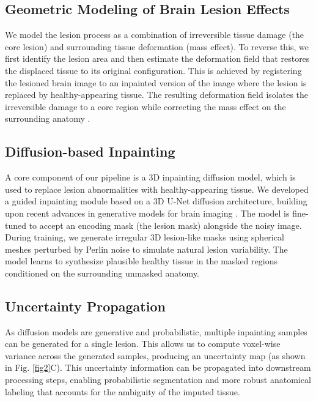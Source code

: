 \documentclass[runningheads]{llncs}
\begin{document}
\subsection{Geometric Modeling of Brain Lesion Effects}
We model the lesion process as a combination of irreversible tissue damage (the core lesion) and surrounding tissue deformation (mass effect). To reverse this, we first identify the lesion area and then estimate the deformation field that restores the displaced tissue to its original configuration. This is achieved by registering the lesioned brain image to an inpainted version of the image where the lesion is replaced by healthy-appearing tissue. The resulting deformation field isolates the irreversible damage to a core region while correcting the mass effect on the surrounding anatomy  \cite{Vercauteren2009}.


\subsection{Diffusion-based Inpainting}
A core component of our pipeline is a 3D inpainting diffusion model, which is used to replace lesion abnormalities with healthy-appearing tissue. We developed a guided inpainting module based on a 3D U-Net diffusion architecture, building upon recent advances in generative models for brain imaging \cite{Pinaya2022}. The model is fine-tuned to accept an encoding mask (the lesion mask) alongside the noisy image. During training, we generate irregular 3D lesion-like masks using spherical meshes perturbed by Perlin noise to simulate natural lesion variability. The model learns to synthesize plausible healthy tissue in the masked regions conditioned on the surrounding unmasked anatomy.


\subsection{Uncertainty Propagation}
As diffusion models are generative and probabilistic, multiple inpainting samples can be generated for a single lesion. This allows us to compute voxel-wise variance across the generated samples, producing an uncertainty map (as shown in Fig. \ref{fig2}C). This uncertainty information can be propagated into downstream processing steps, enabling probabilistic segmentation and more robust anatomical labeling that accounts for the ambiguity of the imputed tissue.
\end{document}

